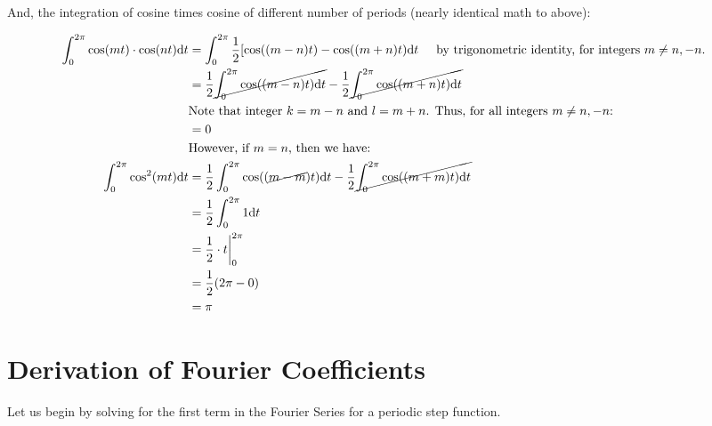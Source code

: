 \documentclass[10pt]{article} %
\begin{document}
And, the integration of cosine times cosine of different number of periods (nearly identical math to above):

\begin{align*}
    \int_0^{2\pi} \cos(mt) \cdot \cos(nt) \mathrm{d}t &=\int_0^{2\pi}\frac12[\cos((m-n)t) - \cos((m+n)t) \mathrm{d}t \text{\hspace{0.5cm}by trigonometric identity, for integers $m \neq n, -n$.}&\\
    & =\frac12\cancel{\int_0^{2\pi}\cos((m-n)t)\mathrm{d}t} - \frac12\cancel{\int_0^{2\pi}\cos((m+n)t)\mathrm{d}t}\\
    & \text{Note that integer $k = m-n$ and $l = m+n$. Thus, for all integers $m \neq n, -n$:} &\\
    & = 0 \\
    & \text{However, if $m = n$, then we have:}\\
    \int_0^{2\pi} \cos^2(mt)\mathrm{d}t & = \frac12\int_0^{2\pi}\cos((\cancel{m-m})t)\mathrm{d}t - \frac12\cancel{\int_0^{2\pi}\cos((m+m)t)\mathrm{d}t}\\
    & = \frac12\int_0^{2\pi}1\mathrm{d}t\\
    & = \frac12 \cdot t \bigg\rvert_0^{2\pi} \\
    & = \frac12 (2\pi - 0) \\
    & = \pi
\end{align*}

\section*{Derivation of Fourier Coefficients} %

Let us begin by solving for the first term in the Fourier Series for a periodic step function.
\end{document}
